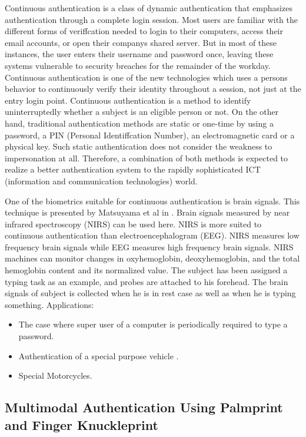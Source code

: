 \documentclass[10pt,a4paper,journal]{IEEEtran}
\begin{document}
\hspace{2em} Continuous authentication is a class of dynamic authentication that emphasizes authentication through a complete login session. Most users are familiar with the different forms of veriffcation needed to login to their computers, access their email accounts, or open their companys shared server. But in most of these instances, the user enters their username and password once, leaving these systems vulnerable to security breaches for the remainder of the workday. Continuous authentication is one of the new technologies which uses a persons behavior to continuously verify their identity throughout a session, not just at the entry login point. Continuous authentication is a method to identify uninterruptedly whether a subject is an eligible person or not. On the other hand, traditional authentication methods are static or one-time by using a password, a PIN (Personal Identiffcation Number), an electromagnetic card or a physical key. Such static authentication does not consider the weakness to impersonation at all. Therefore, a combination of both methods is expected to realize a better authentication system to the rapidly sophisticated ICT (information and communication technologies) world.

\hspace{} One of the biometrics suitable for continuous authentication is brain signals. This technique is presented by Matsuyama et al in \cite{8}. Brain signals measured by near infrared spectroscopy (NIRS) can be used here. NIRS is more suited to continuous authentication than electroencephalogram (EEG). NIRS measures low frequency brain signals while EEG measures high frequency brain signals. NIRS machines can monitor changes in oxyhemoglobin, deoxyhemoglobin, and the total hemoglobin content and its normalized value. The subject has been assigned a typing task as an example, and probes are attached to his forehead. The brain signals of subject is collected when he is in rest case as well as when he is typing something\cite{9}.
Applications:
\begin{itemize}
    \item The case where super user of a computer is periodically required to type a password.
    \item Authentication of a special purpose vehicle \cite{10}.
    \item Special Motorcycles.
\end{itemize}

\subsection{Multimodal Authentication Using Palmprint and Finger Knuckleprint}
\end{document}
